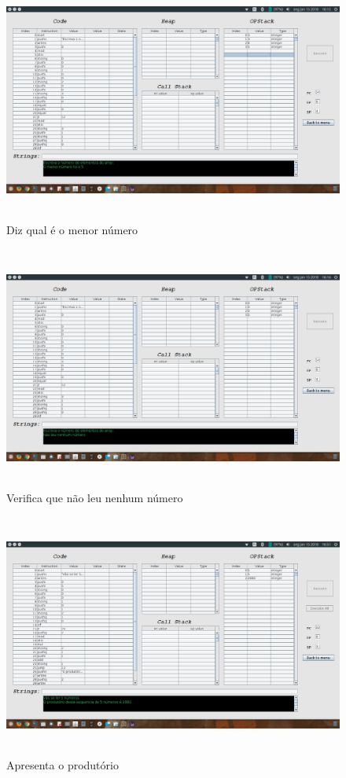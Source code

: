 \documentclass{report}
\begin{document}
\begin{figure}[h]
	\centering
	\includegraphics[width=14cm,height= 8cm]{exemplo2-1.png}
	\caption{Diz qual é o menor número}
	\label{Exemplo 2.1}
\end{figure}

\begin{figure}[h]
	\centering
	\includegraphics[width=14cm,height= 8cm]{exemplo2-2.png}
	\caption{Verifica que não leu nenhum número}
	\label{Exemplo 2.2}
\end{figure}

\begin{figure}[h]
	\centering
	\includegraphics[width=14cm,height= 8cm]{exemplo3-1.png}
	\caption{Apresenta o produtório}
	\label{Exemplo 3.1}
\end{figure}
\end{document}
